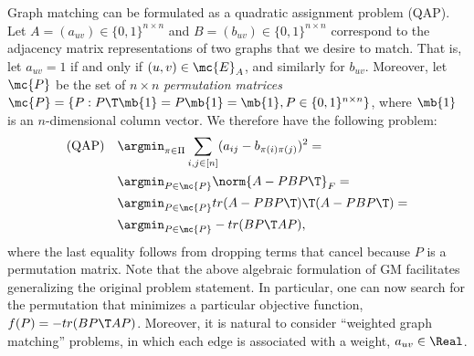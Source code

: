 \documentclass[10pt,journal,cspaper,compsoc]{IEEEtran}
\newcommand{\PmcP}{P \in \mc{P}}
\begin{document}
Graph matching can be formulated as a quadratic assignment problem (QAP).  Let $A=(a_{uv}) \in \{0,1\}^{n \times n}$ and $B=(b_{uv}) \in \{0,1\}^{n \times n}$ correspond to the adjacency matrix representations of two graphs that we desire to match. That is, let $a_{uv}=1$ if and only if $(u,v) \in \mc{E}_A$, and similarly for $b_{uv}$.  Moreover, let $\mc{P}$ be the set of  $n \times n$ \emph{permutation matrices}  $\mc{P}=\{P : P\T \mb{1} = P \mb{1} = \mb{1}, P \in \{0,1\}^{n \times n}\}$, where $\mb{1}$ is an $n$-dimensional column vector.
% 
We therefore have the following problem:  
\begin{subequations} \label{eq:GM}
\begin{align}
\text{(QAP)} \quad 	&\argmin_{\pi \in \Pi} \sum_{i,j \in [n]} (a_{ij} - b_{\pi(i) \pi(j)})^2= \\
	&\argmin_{\PmcP} \norm{A - PBP\T}_F = \\
	&\argmin_{\PmcP} tr(A - PBP\T)\T (A - PBP\T) = \label{eq:trQAP2} \\
	&\argmin_{\PmcP} - tr(B P\T AP), \label{eq:trQAP} %
\end{align}
\end{subequations}
where the last equality follows from dropping terms that cancel because $P$ is a permutation matrix. Note that the above algebraic formulation of GM facilitates generalizing the original problem statement. In particular, one can now search for the permutation that minimizes a particular objective function, $f(P)=- tr(B P\T AP)$.  Moreover, it is natural to consider ``weighted graph matching''  problems, in which each edge is associated with a weight, $a_{uv} \in \Real$.  
\end{document}
